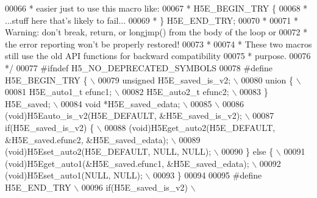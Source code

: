 \begin{DoxyCode}
00066 \textcolor{comment}{ * easier just to use this macro like:}
00067 \textcolor{comment}{ *  H5E\_BEGIN\_TRY \{}
00068 \textcolor{comment}{ *      ...stuff here that's likely to fail...}
00069 \textcolor{comment}{ *      \} H5E\_END\_TRY;}
00070 \textcolor{comment}{ *}
00071 \textcolor{comment}{ * Warning: don't break, return, or longjmp() from the body of the loop or}
00072 \textcolor{comment}{ *      the error reporting won't be properly restored!}
00073 \textcolor{comment}{ *}
00074 \textcolor{comment}{ * These two macros still use the old API functions for backward compatibility}
00075 \textcolor{comment}{ * purpose.}
00076 \textcolor{comment}{ */}
00077 \textcolor{preprocessor}{#ifndef H5\_NO\_DEPRECATED\_SYMBOLS}
00078 \textcolor{preprocessor}{#define H5E\_BEGIN\_TRY \{                               \(\backslash\)}
00079 \textcolor{preprocessor}{    unsigned H5E\_saved\_is\_v2;                                 \(\backslash\)}
00080 \textcolor{preprocessor}{    union \{                                   \(\backslash\)}
00081 \textcolor{preprocessor}{        H5E\_auto1\_t efunc1;                           \(\backslash\)}
00082 \textcolor{preprocessor}{        H5E\_auto2\_t efunc2;                               \(\backslash\)}
00083 \textcolor{preprocessor}{    \} H5E\_saved;                                  \(\backslash\)}
00084 \textcolor{preprocessor}{    void *H5E\_saved\_edata;                            \(\backslash\)}
00085 \textcolor{preprocessor}{                                              \(\backslash\)}
00086 \textcolor{preprocessor}{    (void)H5Eauto\_is\_v2(H5E\_DEFAULT, &H5E\_saved\_is\_v2);                   \(\backslash\)}
00087 \textcolor{preprocessor}{    if(H5E\_saved\_is\_v2) \{                             \(\backslash\)}
00088 \textcolor{preprocessor}{        (void)H5Eget\_auto2(H5E\_DEFAULT, &H5E\_saved.efunc2, &H5E\_saved\_edata); \(\backslash\)}
00089 \textcolor{preprocessor}{        (void)H5Eset\_auto2(H5E\_DEFAULT, NULL, NULL);                      \(\backslash\)}
00090 \textcolor{preprocessor}{    \} else \{                                      \(\backslash\)}
00091 \textcolor{preprocessor}{        (void)H5Eget\_auto1(&H5E\_saved.efunc1, &H5E\_saved\_edata);              \(\backslash\)}
00092 \textcolor{preprocessor}{        (void)H5Eset\_auto1(NULL, NULL);                       \(\backslash\)}
00093 \textcolor{preprocessor}{    \}}
00094 
00095 \textcolor{preprocessor}{#define H5E\_END\_TRY                               \(\backslash\)}
00096 \textcolor{preprocessor}{    if(H5E\_saved\_is\_v2)                               \(\backslash\)}

\end{DoxyCode}
